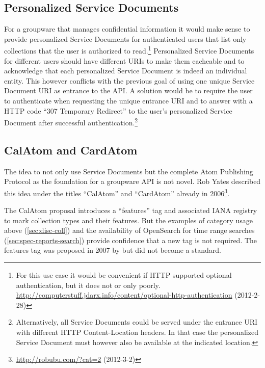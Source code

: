 \documentclass[11pt,a4paper,headsepline,twoside]{scrartcl}		%
\newcommand{\citeurl}[2]{\url{#1} (#2)}
\begin{document}
\subsection{Personalized Service Documents} For a groupware that manages
confidential information it would make sense to provide personalized Service
Documents for authenticated users that list only collections that the user is
authorized to read.\footnote{For this use case it would be convenient if HTTP
  supported optional authentication, but it does not or only
  poorly. \citeurl{http://computerstuff.jdarx.info/content/optional-http-authentication}{2012-2-28}}
Personalized Service Documents for different users should have different URIs to
make them cacheable and to acknowledge that each personalized Service Document
is indeed an individual entity. This however conflicts with the previous goal of
using one unique Service Document URI as entrance to the API. A solution would
be to require the user to authenticate when requesting the unique entrance URI
and to answer with a HTTP code ``307 Temporary Redirect'' to the user's
personalized Service Document after successful
authentication.\footnote{Alternatively, all Service Documents could be served under
  the entrance URI with different HTTP Content-Location
  headers\cite[sec. 14.14]{RFC2616}. In that case the personalized Service
  Document must however also be available at the indicated location.}


\subsection{CalAtom and CardAtom}
\label{sec:atom-publ-prot}

The idea to not only use Service Documents but the complete Atom Publishing
Protocol as the foundation for a groupware API is not novel. Rob Yates described
this idea under the titles ``CalAtom'' and ``CardAtom'' already in
2006\footnote{\citeurl{http://robubu.com/?cat=2}{2012-3-2}}.

The CalAtom \cite{draft-yates-atompub-calatom-00.txt} proposal introduces a
``features'' tag and associated IANA registry to mark collection types and their
features. But the examples of category usage above (\autoref{sec:disc-coll}) and
the availability of OpenSearch for time range searches
(\autoref{sec:spec-reports-search}) provide confidence that a new tag is not
required. The features tag was proposed in 2007 by
\cite{draft-snell-atompub-feature} but did not become a standard.
\end{document}
